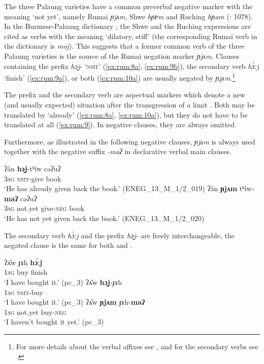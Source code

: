 \documentclass[output=paper,colorlinks,citecolor=brown]{langscibook}
\begin{document}
The three Palaung varieties have a common preverbal negative marker with the meaning ‘not yet’, namely Rumai \textit{ɲjʌm}, Shwe \textit{hɲɐm} \citep[176]{Milne1921} and Ruching \textit{hɲam} (\citealt{DeepadungEtAl2015}: 1078). In the Burmese-Palaung dictionary \citep[131]{Unknown2012}, the Shwe and the Ruching expressions are cited as verbs with the meaning ‘dilatory, stiff’ (the corresponding Rumai verb in the dictionary is \textit{moj}). This suggests that a former common verb of the three Palaung varieties is the source of the Rumai negation marker \textit{ɲjʌm}.
Clauses containing the prefix \textit{hɔ̰j}- ‘\textsc{nsit}’  (\ref{ex:rum:8a}, \ref{ex:rum:9b}), the secondary verb \textit{hɔ̀ːj} ‘finish’ (\ref{ex:rum:9a}), or both (\ref{ex:rum:10a}) are usually negated by \textit{ɲjʌm}.\footnote{For more details about the verbal affixes see \citet{Weymuth2018}, and for the secondary verbs see \citet{Weymuth2023}.}

The prefix and the secondary verb are aspectual markers which denote a new (and usually expected) situation after the transgression of a limit \citep[125]{Jenny2001}. Both may be translated by ‘already’ (\ref{ex:rum:8a}, \ref{ex:rum:10a}), but they do not have to be translated at all (\ref{ex:rum:9}). In negative clauses, they are always omitted.

Furthermore, as illustrated in the following negative clauses, \textit{ɲjʌm} is always used together with the negative suffix \textit{{}-maʔ} in declarative verbal main clauses.

\ea\label{ex:rum:8}
    \ea\label{ex:rum:8a}
        \gll ʔân	\textbf{hɔ̰j}-tʰîw	cəʔuʔ \\ 
             3\textsc{sg} \textsc{nsit}{}-give book \\
        \glt ‘He has already given back the book.’ (ENEG\_13\_M\_1/2\_019)
    \ex\label{ex:rum:8b}
        \gll ʔân	\textbf{ɲjʌm}	tʰîw-\textbf{maʔ}	cəʔuʔ \\
             3\textsc{sg} not.yet give-\textsc{neg} book \\
        \glt ‘He has not yet given back the book.’ (ENEG\_13\_M\_1/2\_020)
    \z
\z 

The secondary verb \textit{hɔ̀ːj}  and the prefix \textit{hɔ̰j-}  are freely interchangeable, the negated clause  is the same for both  and .

\ea\label{ex:rum:9}
    \ea\label{ex:rum:9a}
        \gll ʔʌ̂w	ɟɤh	\textbf{hɔ̀ːj} \\ 
             1\textsc{sg} buy finish \\
        \glt ‘I have bought it.’ (pc\_3)
    \ex\label{ex:rum:9b}
        \gll ʔʌ̂w	\textbf{hɔ̰j}-ɟɤh \\
             1\textsc{sg} \textsc{nsit}{}-buy \\
        \glt ‘I have bought it.’ (pc\_3)
    \ex\label{ex:rum:9c}
        \gll ʔʌ̂w	\textbf{ɲjʌm}	ɟɤh-\textbf{maʔ} \\
              1\textsc{sg} not.yet buy-\textsc{neg} \\
        \glt ‘I haven’t bought it yet.’ (pc\_3)
    \z
\z 
\end{document}
